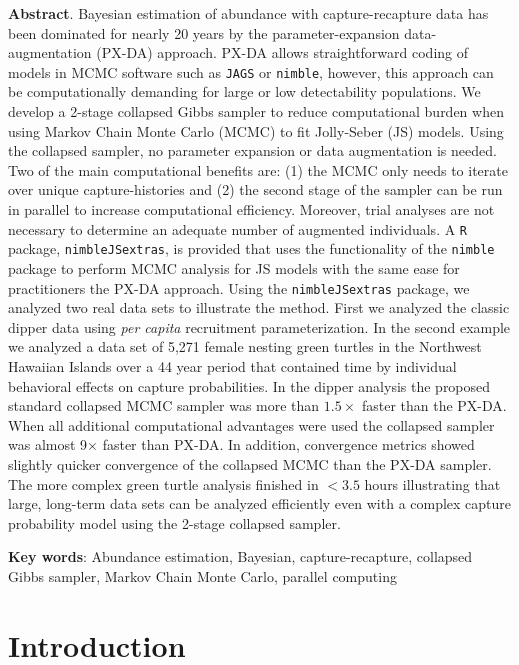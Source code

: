 \documentclass[11pt]{article}
\begin{document}
{\bf Abstract}. Bayesian estimation of abundance with capture-recapture data has been dominated for nearly 20 years by the parameter-expansion data-augmentation (PX-DA) approach. PX-DA allows straightforward coding of models in MCMC software such as {\tt JAGS} or {\tt nimble}, however, this approach can be computationally demanding for large or low detectability populations. We develop a 2-stage collapsed Gibbs sampler to reduce computational burden when using Markov Chain Monte Carlo (MCMC) to fit Jolly-Seber (JS) models. Using the collapsed sampler, no parameter expansion or data augmentation is needed. Two of the main computational benefits are: (1) the MCMC only needs to iterate over unique capture-histories and (2) the second stage of the sampler can be run in parallel to increase computational efficiency. Moreover, trial analyses are not necessary to determine an adequate number of augmented individuals. A {\tt R} package, {\tt nimbleJSextras}, is provided that uses the functionality of the {\tt nimble} package to perform MCMC analysis for JS models with the same ease for practitioners the PX-DA approach.  Using the {\tt nimbleJSextras} package, we analyzed two real data sets to illustrate the method. First we analyzed the classic dipper data using {\it per capita} recruitment parameterization. In the second example we analyzed a data set of 5,271 female nesting green turtles in the Northwest Hawaiian Islands over a 44 year period that contained time by individual behavioral effects on capture probabilities. In the dipper analysis the proposed standard collapsed MCMC sampler was more than $1.5\times$ faster than the PX-DA. When all additional computational advantages were used the collapsed sampler was almost 9$\times$ faster than PX-DA. In addition, convergence metrics showed slightly quicker convergence of the collapsed MCMC than the PX-DA sampler. The more complex green turtle analysis finished in $<3.5$ hours illustrating that large, long-term data sets can be analyzed efficiently even with a complex capture probability model using the 2-stage collapsed sampler. 

\bigskip

{\bf Key words}: Abundance estimation, Bayesian, capture-recapture, collapsed Gibbs sampler, Markov Chain Monte Carlo, parallel computing


\raggedright
\setlength{\parindent}{2em}
\raggedbottom


\section{Introduction}
\end{document}
